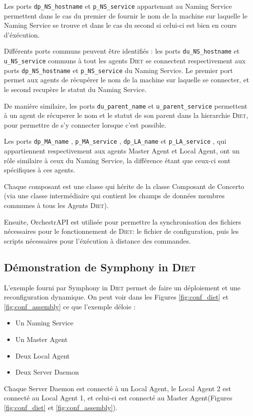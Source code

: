 \documentclass{article}
\newcommand{\diet}{\textsc{Diet}\xspace} %
\newcommand{\ns}{Naming Service\xspace}
\newcommand{\ma}{Master Agent\xspace}
\newcommand{\la}{Local Agent\xspace}
\newcommand{\sed}{Server Daemon\xspace}
\newcommand{\concerto}{Concerto\xspace}
\newcommand{\symphonyind}{Symphony in \diet} %
\newcommand{\orchestrapi}{OrchestrAPI\xspace}
\begin{document}
Les ports \og \texttt{dp\_NS\_hostname} \fg et \og \texttt{p\_NS\_service} \fg
appartenant au \ns permettent dans le cas du premier de fournir le nom de la
machine sur laquelle le \ns se trouve et dans le cas du second si celui-ci est
bien en cours d'éxécution.

Différents ports communs peuvent être identifiés : les ports \og
\texttt{du\_NS\_hostname} \fg et \og \texttt{u\_NS\_service} \fg  communs à tout
les agents \diet se connectent respectivement aux ports \og
\texttt{dp\_NS\_hostname} \fg et \og \texttt{p\_NS\_service} \fg du \ns.
Le premier port permet aux agents de récupérer le nom de la machine sur laquelle
se connecter, et le second recupère le statut du \ns.

De manière similaire, les ports \og \texttt{du\_parent\_name} \fg et \og
\texttt{u\_parent\_service} \fg permettent à un agent de récuperer le nom et le
statut de son parent dans la hierarchie \diet, pour permettre de s'y connecter
lorsque c'est possible.

Les ports \og \texttt{dp\_MA\_name} \fg, \og \texttt{p\_MA\_service} \fg, \og
\texttt{dp\_LA\_name} \fg et \og \texttt{p\_LA\_service} \fg, qui appartiennent
respectivement aux agents \ma et \la, ont un rôle similaire à ceux du \ns, la
différence étant que ceux-ci sont spécifiques à ces agents.\newline


Chaque composant est une classe qui hérite de la classe Composant de \concerto
(via une classe intermédiaire qui contient les champs de données membres
communes à tous les Agents \diet).

Ensuite, \orchestrapi est utilisée pour permettre la synchronisation des
fichiers nécessaires pour le fonctionnement de \diet : le fichier de
configuration, puis les scripts nécessaires pour l'éxécution à distance des
commandes.


\subsection{Démonstration de \symphonyind}
L'exemple fourni par \symphonyind permet de faire un déploiement et une
reconfiguration dynamique.
On peut voir dans les Figures \ref{fig:conf_diet} et \ref{fig:conf_assembly} ce que l'exemple déloie :
\begin{itemize}
	\item Un \ns
	\item Un \ma
	\item Deux \la
	\item Deux \sed
\end{itemize}
Chaque \sed est connecté à un \la, le \la 2 est connecté au \la 1, et celui-ci
est connecté au \ma (Figures \ref{fig:conf_diet} et \ref{fig:conf_assembly}).
\end{document}
